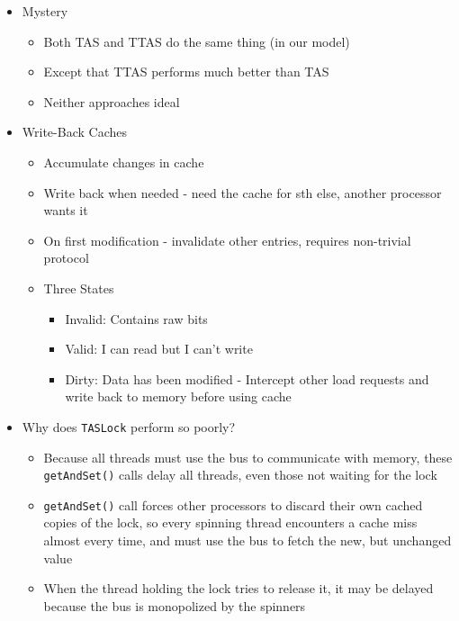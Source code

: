\documentclass[12pt]{article}
\begin{document}
{\begin{itemize}
\begin{itemize}
		\begin{itemize}
			\item As soon as lock looks available
			\item Read returns false (lock is free)
			\item Call TAS to acquire lock
			\item If TAS loses, back to lurking
		\end{itemize}
		\item Mystery
		\begin{itemize}
			\item Both TAS and TTAS do the same thing (in our model)
			\item Except that TTAS performs much better than TAS
			\item Neither approaches ideal
		\end{itemize}
		\item Write-Back Caches
		\begin{itemize}
			\item Accumulate changes in cache
			\item Write back when needed - need the cache for sth else, another processor wants it
			\item On first modification - invalidate other entries, requires non-trivial protocol
			\item Three States
			\begin{itemize}
				\item Invalid: Contains raw bits
				\item Valid: I can read but I can't write
				\item Dirty: Data has been modified - Intercept other load requests and write back to memory before using cache
			\end{itemize}
		\end{itemize}
		\item Why does \texttt{TASLock} perform so poorly?
		\begin{itemize}
			\item Because all threads
			must use the bus to communicate with memory, these \texttt{getAndSet()} calls delay
			all threads, even those not waiting for the lock
			\item \texttt{getAndSet()} call forces other processors to discard their own cached copies of the lock, so every spinning thread encounters a cache miss almost every time, and must use the bus to fetch the new, but unchanged value
			\item When the thread holding the lock tries to release it, it may be delayed because the bus is monopolized by the spinners

\end{itemize}
\end{itemize}
\end{itemize}}
\end{document}
